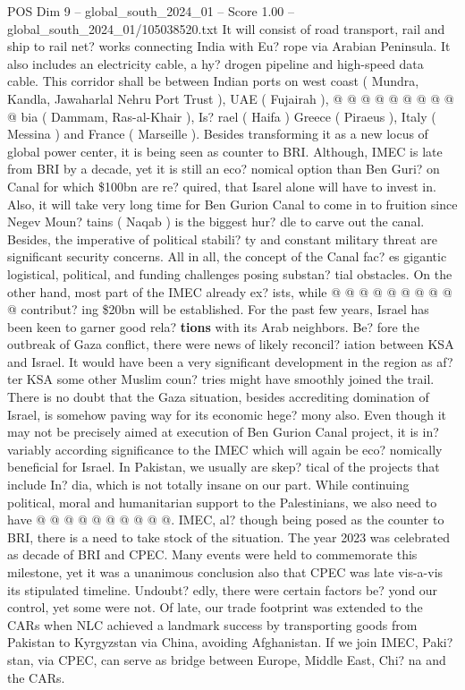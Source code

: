 \begin{textsample}{POS Dim 9 – global\_south\_2024\_01 – Score 1.00 – global\_south\_2024\_01/105038520.txt}
It will consist of road transport, rail and ship to rail net? works connecting India with Eu? rope via Arabian Peninsula.
It also includes an electricity cable, a hy? drogen pipeline and high-speed data cable.
This corridor shall be between Indian ports on west coast ( Mundra, Kandla, Jawaharlal Nehru Port Trust ), UAE ( Fujairah ), @ @ @ @ @ @ @ @ @ @ bia ( Dammam, Ras-al-Khair ), Is? rael ( Haifa ) Greece ( Piraeus ), Italy ( Messina ) and France ( Marseille ).
Besides transforming it as a new locus of global power center, it is being seen as counter to BRI.
Although, IMEC is late from BRI by a decade, yet it is still an eco? nomical option than Ben Guri? on Canal for which \$100bn are re? quired, that Isarel alone will have to invest in.
Also, it will take very long time for Ben Gurion Canal to come in to fruition since Negev Moun? tains ( Naqab ) is the biggest hur? dle to carve out the canal.
Besides, the imperative of political stabili? ty and constant military threat are significant security concerns.
All in all, the concept of the Canal fac? es gigantic logistical, political, and funding challenges posing substan? tial obstacles.
On the other hand, most part of the IMEC already ex? ists, while @ @ @ @ @ @ @ @ @ @ contribut? ing \$20bn will be established.
For the past few years, Israel has been keen to garner good rela? \textbf{tions} with its Arab neighbors.
Be? fore the outbreak of Gaza conflict, there were news of likely reconcil? iation between KSA and Israel.
It would have been a very significant development in the region as af? ter KSA some other Muslim coun? tries might have smoothly joined the trail.
There is no doubt that the Gaza situation, besides accrediting domination of Israel, is somehow paving way for its economic hege? mony also.
Even though it may not be precisely aimed at execution of Ben Gurion Canal project, it is in? variably according significance to the IMEC which will again be eco? nomically beneficial for Israel.
In Pakistan, we usually are skep? tical of the projects that include In? dia, which is not totally insane on our part.
While continuing political, moral and humanitarian support to the Palestinians, we also need to have @ @ @ @ @ @ @ @ @ @.
IMEC, al? though being posed as the counter to BRI, there is a need to take stock of the situation.
The year 2023 was celebrated as decade of BRI and CPEC.
Many events were held to commemorate this milestone, yet it was a unanimous conclusion also that CPEC was late vis-a-vis its stipulated timeline.
Undoubt? edly, there were certain factors be? yond our control, yet some were not.
Of late, our trade footprint was extended to the CARs when NLC achieved a landmark success by transporting goods from Pakistan to Kyrgyzstan via China, avoiding Afghanistan.
If we join IMEC, Paki? stan, via CPEC, can serve as bridge between Europe, Middle East, Chi? na and the CARs.

\end{textsample}
